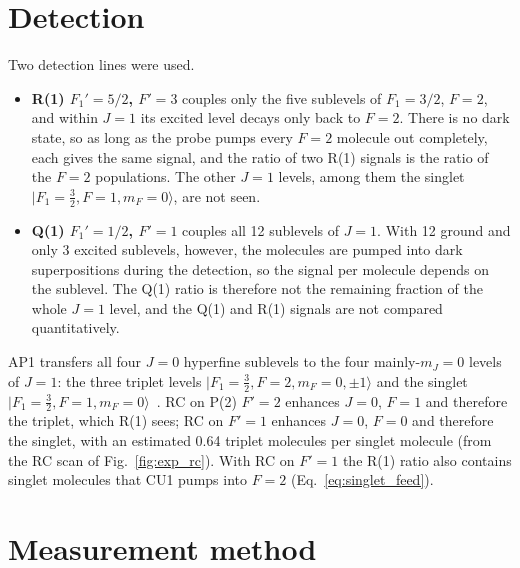 \documentclass[11pt,a4paper,oneside]{report}
\begin{document}
\section{Detection}
\label{sec:exp_detection}

Two detection lines were used.
\begin{itemize}
  \item \textbf{R(1) $F_1'=5/2$, $F'=3$} couples only the five sublevels of $F_1=3/2$, $F=2$, and
        within $J=1$ its excited level decays only back to $F=2$. There is no dark state, so as long
        as the probe pumps every $F=2$ molecule out completely, each gives the same signal, and the
        ratio of two R(1) signals is the ratio of the $F=2$ populations. The other $J=1$ levels,
        among them the singlet $|F_1=\tfrac32,F=1,m_F=0\rangle$, are not seen.
  \item \textbf{Q(1) $F_1'=1/2$, $F'=1$} couples all 12 sublevels of $J=1$. With 12 ground and only 3
        excited sublevels, however, the molecules are pumped into dark superpositions during the
        detection, so the signal per molecule depends on the sublevel. The Q(1) ratio is therefore not
        the remaining fraction of the whole $J=1$ level, and the Q(1) and R(1) signals are not compared
        quantitatively.
\end{itemize}
AP1 transfers all four $J=0$ hyperfine sublevels to the four mainly-$m_J=0$ levels of $J=1$: the
three triplet levels $|F_1=\tfrac32,F=2,m_F=0,\pm1\rangle$ and the singlet
$|F_1=\tfrac32,F=1,m_F=0\rangle$~\cite{Grasdijk2025AP}. RC on P(2) $F'=2$ enhances $J=0$, $F=1$ and
therefore the triplet, which R(1) sees; RC on $F'=1$ enhances $J=0$, $F=0$ and therefore the singlet,
with an estimated 0.64 triplet molecules per singlet molecule (from the RC scan of
Fig.~\ref{fig:exp_rc}). With RC on $F'=1$
the R(1) ratio also contains singlet molecules that CU1 pumps into $F=2$ (Eq.~\eqref{eq:singlet_feed}).

\section{Measurement method}
\label{sec:exp_method}
\end{document}
